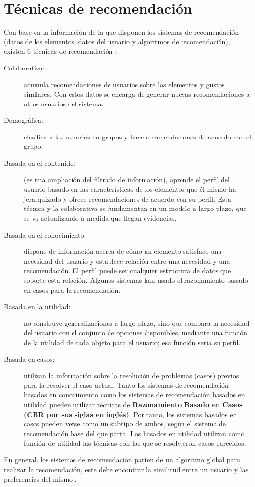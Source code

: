\documentclass[12pt,letterpaper,oneside] {memoir}
\begin{document}
\section{Técnicas de recomendación}
Con base en la información de la que disponen los sistemas de recomendación (datos de los elementos, datos del usuario y algoritmos de recomendación), existen 6 técnicas de recomendación \citep{Burke2002}:

\begin{description}
\item[Colaborativa:] acumula recomendaciones de usuarios sobre los elementos y gustos similares. Con estos datos se encarga de generar nuevas recomendaciones a otros usuarios del sistema.
\item[Demográfica:] clasifica a los usuarios en grupos y hace recomendaciones de acuerdo con el grupo.
\item[Basada en el contenido:] (es una ampliación del filtrado de información), aprende el perfil del usuario basado en las características de los elementos que él mismo ha jerarquizado y ofrece recomendaciones de acuerdo con su perfil. Esta técnica y la colaborativa se fundamentan en un modelo a largo plazo, que se va actualizando a medida que llegan evidencias.
\item[Basada en el conocimiento:] dispone de información acerca de cómo un elemento satisface una necesidad del usuario y establece relación entre una necesidad y una recomendación. El perfil puede ser cualquier estructura de datos que soporte esta relación. Algunos sistemas han usado el razonamiento basado en casos para la recomendación.
\item[Basada en la utilidad:] no construye generalizaciones a largo plazo, sino que compara la necesidad del usuario con el conjunto de opciones disponibles, mediante una función de la utilidad de cada objeto para el usuario; esa función seria su perfil.
\item[Basada en casos:] utilizan la información sobre la resolución de problemas (casos) previos para la resolver el caso actual. Tanto los sistemas de recomendación basados en conocimiento como los sistemas de recomendación basados en utilidad pueden utilizar técnicas de  \textbf{Razonamiento Basado en Casos (CBR por sus siglas en inglés)}. Por tanto, los sistemas basados en casos pueden verse como un subtipo de ambos, según el sistema de recomendación base del que parta. Los basados en utilidad utilizan como función de utilidad las técnicas con las que se resolvieron casos parecidos.
\end{description}
En general, los sistemas de recomendación parten de un algoritmo global para realizar la recomendación, este debe encontrar la similitud entre un usuario y las preferencias del mismo \citep{GuzmanAlvarez}.
\end{document}
